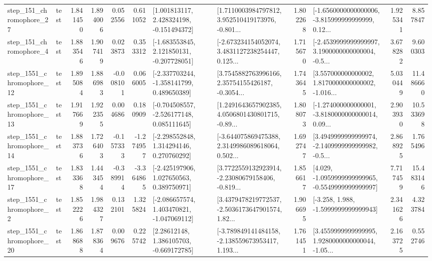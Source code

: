 \begin{tabular}{llrrrrllrlrr}
  step\_151\_chromophore\_27 &      test &      1.841450 &    1.894006 &      0.052556 &  0.611052 &    [1.001813117, 2.428324198, -0.151494372] &  [1.7110003984797812, 3.952510419173976, -0.801... &       1.802268 &  [-1.6560000000000006, -3.815999999999999, 0.12... &            1.925341 &          8.857847 \\
   step\_151\_chromophore\_4 &      test &      1.883546 &    1.907419 &      0.023873 &  0.353312 &   [-1.683553845, 2.121850131, -0.207728051] &  [-2.673234154052074, 3.4831127238254447, 0.125... &       1.715670 &  [-2.4539999999999997, 3.1900000000000004, -0.5... &            3.678282 &          9.600303 \\
 step\_1551\_chromophore\_12 &      test &      1.895084 &    1.886983 &     -0.008101 &  0.066005 &   [-2.337703244, -1.358141799, 0.489650389] &  [3.7545882763996166, 2.35754155426187, -0.3054... &       1.743645 &  [3.557000000000002, 1.8170000000000002, -1.016... &            5.030449 &         11.486660 \\
 step\_1551\_chromophore\_13 &      test &      1.917669 &    1.922355 &      0.004686 &  0.180909 &   [-0.704508557, -2.526177148, 0.085111645] &  [1.2491643657902385, 4.0506801430801715, -0.89... &       1.808073 &  [-1.274000000000001, -3.8180000000000014, 0.09... &            2.903930 &         10.533698 \\
 step\_1551\_chromophore\_14 &      test &      1.883736 &    1.726403 &     -0.157333 & -1.274957 &    [-2.298552848, 1.314294146, 0.270760292] &  [-3.644075869475388, 2.3149986089618064, 0.502... &       1.692747 &  [3.4949999999999974, -2.1409999999999982, -0.5... &            2.868925 &          1.765496 \\
 step\_1551\_chromophore\_17 &      test &      1.833368 &    1.443454 &     -0.389914 & -3.364865 &    [-2.425197906, 1.027650563, 0.389750971] &  [3.7722559132923914, -2.23080679158406, -0.819... &       1.856617 &  [4.029, -1.0959999999999965, -0.5549999999999997] &            7.717459 &         15.483146 \\
  step\_1551\_chromophore\_2 &      test &      1.852226 &    1.984327 &      0.132101 &  1.325824 &   [-2.086657574, 1.403470821, -1.047069112] &  [3.4379478219772537, -2.5036173647901574, 1.82... &       1.906695 &               [-3.258, 1.988, -1.5999999999999943] &            2.341626 &          4.323784 \\
 step\_1551\_chromophore\_20 &      test &      1.868688 &    1.878364 &      0.009676 &  0.225742 &     [2.28612148, 1.386105703, -0.669172785] &  [-3.789849141484158, -2.138559673953417, 1.193... &       1.761451 &  [3.4559999999999995, 1.9280000000000044, -1.05... &            2.163725 &          0.552746 \\

\end{tabular}
